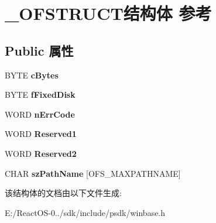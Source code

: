 \hypertarget{struct___o_f_s_t_r_u_c_t}{}\section{\+\_\+\+O\+F\+S\+T\+R\+U\+C\+T结构体 参考}
\label{struct___o_f_s_t_r_u_c_t}
\subsection*{Public 属性}
\begin{DoxyCompactItemize}
\item 
\mbox{\label{struct___o_f_s_t_r_u_c_t_ad0c305b74c7e3945e5c74786ec2b0bb6}} 
B\+Y\+TE {\bfseries c\+Bytes}
\item 
\mbox{\label{struct___o_f_s_t_r_u_c_t_acb8bb543355c3909a7408a5599999e01}} 
B\+Y\+TE {\bfseries f\+Fixed\+Disk}
\item 
\mbox{\label{struct___o_f_s_t_r_u_c_t_a7cbb7daf860da695d27f74212bd385fc}} 
W\+O\+RD {\bfseries n\+Err\+Code}
\item 
\mbox{\label{struct___o_f_s_t_r_u_c_t_a9a75b8dddb7612c8c4eeee66d6cbce05}} 
W\+O\+RD {\bfseries Reserved1}
\item 
\mbox{\label{struct___o_f_s_t_r_u_c_t_aff85289c59831473a4473b836fe61c37}} 
W\+O\+RD {\bfseries Reserved2}
\item 
\mbox{\label{struct___o_f_s_t_r_u_c_t_a9290a5294624be5d6892e7e2eaded3ef}} 
C\+H\+AR {\bfseries sz\+Path\+Name} \mbox{[}O\+F\+S\+\_\+\+M\+A\+X\+P\+A\+T\+H\+N\+A\+ME\mbox{]}
\end{DoxyCompactItemize}


该结构体的文档由以下文件生成\+:\begin{DoxyCompactItemize}
\item 
E\+:/\+React\+O\+S-\/0../sdk/include/psdk/winbase.\+h\end{DoxyCompactItemize}
